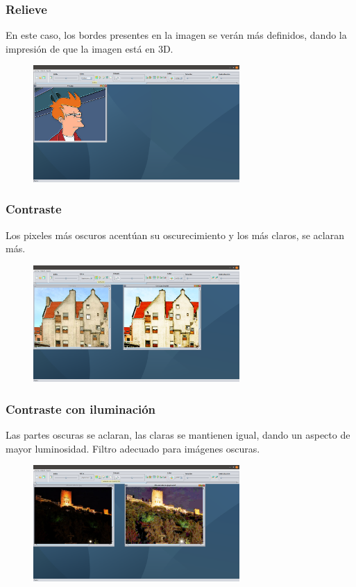 \documentclass[11pt,a4paper]{article}
\begin{document}
\subsubsection{Relieve}
En este caso, los bordes presentes en la imagen se verán más definidos, dando la impresión de que la imagen está en 3D.

\begin{figure}[H]
\centering
	\includegraphics[width=0.7\textwidth]{img/relieve.png}
\end{figure}

\subsubsection{Contraste}
Los pixeles más oscuros acentúan su oscurecimiento y los más claros, se aclaran más.

\begin{figure}[H]
\centering
	\includegraphics[width=0.7\textwidth]{img/contraste.png}
\end{figure}

\subsubsection{Contraste con iluminación}
Las partes oscuras se aclaran, las claras se mantienen igual, dando un aspecto de mayor luminosidad. Filtro adecuado para imágenes oscuras.

\begin{figure}[H]
\centering
	\includegraphics[width=0.7\textwidth]{img/conilu.png}
\end{figure}
\end{document}
